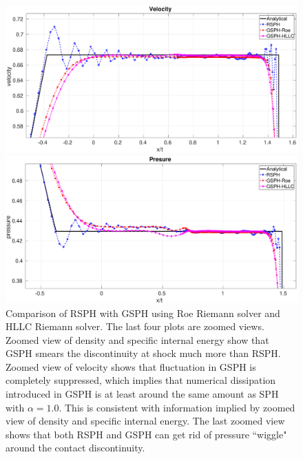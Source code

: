 \documentclass[review]{elsarticle}
\begin{document}
\begin{figure}[H]
\begin{minipage}{.495 \textwidth}
    \end{minipage}%
    \\
    \begin{minipage}{.495 \textwidth}
        \centering
        \includegraphics[width=0.99 \textwidth]{./Figures/Sod/RCM-Sod-GSPH-compare-v-zoom}
    \end{minipage}%
    \begin{minipage}{.495\textwidth}
        \centering
        \includegraphics[width=0.99 \textwidth]{./Figures/Sod/RCM-Sod-GSPH-compare-p-zoom}
    \end{minipage}%
    \caption{Comparison of RSPH with GSPH using Roe Riemann solver and HLLC Riemann solver. The last four plots are zoomed views. Zoomed view of density and specific internal energy show that GSPH smears the discontinuity at shock much more than RSPH. Zoomed view of velocity shows that fluctuation in GSPH is completely suppressed, which implies that numerical dissipation introduced in GSPH is at least around the same amount as SPH with $\alpha=1.0$. This is consistent with information implied by zoomed view of density and specific internal energy. The last zoomed view shows that both RSPH and GSPH can get rid of pressure ``wiggle" around the contact discontinuity.}
    \label{fig:RCM-Sod-GSPH}
\end{figure}
\end{document}
